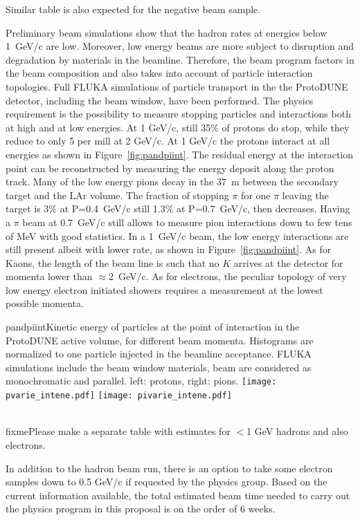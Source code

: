 Similar table is also expected for the negative beam sample. 

Preliminary beam simulations show that the hadron rates at 
energies below 1~GeV/c are low. Moreover, low energy beams are more
subject to disruption and degradation by materials in the
beamline. Therefore, the beam program factors in the beam composition and also takes
into account of particle interaction topologies.  Full FLUKA\cite{fluka05,Fluka15}
 simulations
of particle transport in the the ProtoDUNE detector, including the
beam window, have been performed.
 The physics requirement is the possibility to measure
 stopping particles and  interactions both at high and at low energies.    
At 1 GeV/c, still 35\% of protons do stop, while they reduce to only 5
per mill at 2 GeV/c.  At  1 GeV/c  the protons interact at all
energies as shown in
Figure~\ref{fig:pandpiint}. The residual energy at the interaction
point can be reconstructed by measuring the energy deposit along the proton track.
Many of the  low energy pions decay in the 37~m between the secondary target
and the LAr volume.  The fraction of stopping $\pi$ for one $\pi$
leaving the target is 3\% at P=0.4~GeV/c still  1.3\% at P=0.7~GeV/c,
then decreases.  Having a $\pi$ beam at 0.7~GeV/c still allows to
measure pion interactions down to few tens of MeV with good
statistics. In a 1~GeV/c beam, the low energy interactions are still
present albeit with lower rate, as shown in Figure~\ref{fig:pandpiint}.
As for Kaons, the length of the beam line is such that no
$K$ arrives at the detector for momenta lower than $\approx$2~GeV/c.
As for electrons, the peculiar topology of very low energy electron initiated 
showers requires a measurement at the lowest possible momenta.
\begin{cdrfigure}{pandpiint}{Kinetic energy of
    particles at the point of interaction in the ProtoDUNE active
    volume, for different beam momenta. Histograms are normalized to one particle injected in the
    beamline acceptance. FLUKA simulations include the beam window
    materials, beam are considered as monochromatic and
    parallel. left: protons, right: pions.}
  \texttt{[image: pvarie\_intene.pdf]}
  \texttt{[image: pivarie\_intene.pdf]}
\end{cdrfigure}

\\fixme{Please make a separate table with estimates for $<$1 GeV hadrons and also electrons.}

In addition to the hadron beam run, there is an option to take some electron samples down to 0.5 GeV/c if requested by the physics group. 
Based on the current information available, the total estimated beam time needed to carry out the physics program in this proposal is on the order of 6 weeks.
 
 



